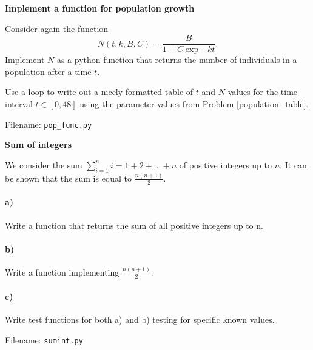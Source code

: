 
\begin{Problem}{\textbf{Implement a function for population growth}}

\noindent Consider again the function
\begin{equation*}
N(t, k, B, C) = \frac{B}{1 + C \exp{-kt}}.
\end{equation*}
Implement $N$ as a python function 
that returns the number of individuals in a population after a time $t$.

Use a  loop to write out a nicely formatted table of $t$ and $N$ values
for the time interval $t \in [0, 48]$ using the parameter values from Problem \ref{population_table}.

Filename: \texttt{pop\_func.py}
\end{Problem}


\begin{Problem}{\textbf{Sum of integers}}

\noindent We consider the sum $\sum_{i = 1}^n i=1+2+\dots+n$ of positive integers up to $n$.
It can be shown that the sum is equal to $\frac{n(n+1)}{2}$.

\paragraph{a)}
Write a function  that returns the sum of all positive
integers up to n.

\paragraph{b)}
Write a function implementing $\frac{n(n+1)}{2}$.

\paragraph{c)}
Write test functions for both a) and b) testing for specific known values.

Filename: \texttt{sumint.py}
\end{Problem}


